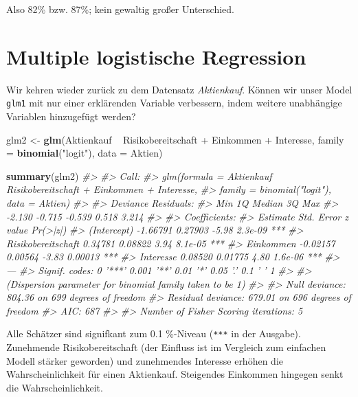 \documentclass[12pt,ngerman,]{book}
\makeatletter
\newenvironment{Shaded}{\begin{snugshade}}{\end{snugshade}}
\newcommand{\KeywordTok}[1]{\textcolor[rgb]{0.13,0.29,0.53}{\textbf{{#1}}}}
\newcommand{\DataTypeTok}[1]{\textcolor[rgb]{0.13,0.29,0.53}{{#1}}}
\newcommand{\StringTok}[1]{\textcolor[rgb]{0.31,0.60,0.02}{{#1}}}
\newcommand{\CommentTok}[1]{\textcolor[rgb]{0.56,0.35,0.01}{\textit{{#1}}}}
\newcommand{\NormalTok}[1]{{#1}}
\newenvironment{kframe}{%
\medskip{}
\setlength{\fboxsep}{.8em}
 \def\at@end@of@kframe{}%
 \ifinner\ifhmode%
  \def\at@end@of@kframe{\end{minipage}}%
  \begin{minipage}{\columnwidth}%
 \fi\fi%
 \def\FrameCommand##1{\hskip\@totalleftmargin \hskip-\fboxsep
 \colorbox{shadecolor}{##1}\hskip-\fboxsep
     \hskip-\linewidth \hskip-\@totalleftmargin \hskip\columnwidth}%
 \MakeFramed {\advance\hsize-\width
   \@totalleftmargin\z@ \linewidth\hsize
   \@setminipage}}%
 {\par\unskip\endMakeFramed%
 \at@end@of@kframe}
\renewenvironment{Shaded}{\begin{kframe}}{\end{kframe}}
\theoremstyle{definition}
\theoremstyle{definition}
\theoremstyle{remark}
\makeatother
\begin{document}
Also 82\% bzw. 87\%; kein gewaltig großer Unterschied.

\section{Multiple logistische
Regression}\label{multiple-logistische-regression}

Wir kehren wieder zurück zu dem Datensatz \emph{Aktienkauf}. Können wir
unser Model \texttt{glm1} mit nur einer erklärenden Variable verbessern,
indem weitere unabhängige Variablen hinzugefügt werden?

\begin{Shaded}
\begin{Highlighting}[]
\NormalTok{glm2 <-}\StringTok{ }\KeywordTok{glm}\NormalTok{(Aktienkauf ~}\StringTok{ }\NormalTok{Risikobereitschaft +}\StringTok{ }\NormalTok{Einkommen +}\StringTok{ }\NormalTok{Interesse, }
            \DataTypeTok{family =} \KeywordTok{binomial}\NormalTok{(}\StringTok{"logit"}\NormalTok{), }
            \DataTypeTok{data =} \NormalTok{Aktien)}

\KeywordTok{summary}\NormalTok{(glm2)}
\CommentTok{#> }
\CommentTok{#> Call:}
\CommentTok{#> glm(formula = Aktienkauf ~ Risikobereitschaft + Einkommen + Interesse, }
\CommentTok{#>     family = binomial("logit"), data = Aktien)}
\CommentTok{#> }
\CommentTok{#> Deviance Residuals: }
\CommentTok{#>    Min      1Q  Median      3Q     Max  }
\CommentTok{#> -2.130  -0.715  -0.539   0.518   3.214  }
\CommentTok{#> }
\CommentTok{#> Coefficients:}
\CommentTok{#>                    Estimate Std. Error z value Pr(>|z|)    }
\CommentTok{#> (Intercept)        -1.66791    0.27903   -5.98  2.3e-09 ***}
\CommentTok{#> Risikobereitschaft  0.34781    0.08822    3.94  8.1e-05 ***}
\CommentTok{#> Einkommen          -0.02157    0.00564   -3.83  0.00013 ***}
\CommentTok{#> Interesse           0.08520    0.01775    4.80  1.6e-06 ***}
\CommentTok{#> ---}
\CommentTok{#> Signif. codes:  0 '***' 0.001 '**' 0.01 '*' 0.05 '.' 0.1 ' ' 1}
\CommentTok{#> }
\CommentTok{#> (Dispersion parameter for binomial family taken to be 1)}
\CommentTok{#> }
\CommentTok{#>     Null deviance: 804.36  on 699  degrees of freedom}
\CommentTok{#> Residual deviance: 679.01  on 696  degrees of freedom}
\CommentTok{#> AIC: 687}
\CommentTok{#> }
\CommentTok{#> Number of Fisher Scoring iterations: 5}
\end{Highlighting}
\end{Shaded}

Alle Schätzer sind signifkant zum 0.1 \%-Niveau (\texttt{***} in der
Ausgabe). Zunehmende Risikobereitschaft (der Einfluss ist im Vergleich
zum einfachen Modell stärker geworden) und zunehmendes Interesse erhöhen
die Wahrscheinlichkeit für einen Aktienkauf. Steigendes Einkommen
hingegen senkt die Wahrscheinlichkeit.
\end{document}
